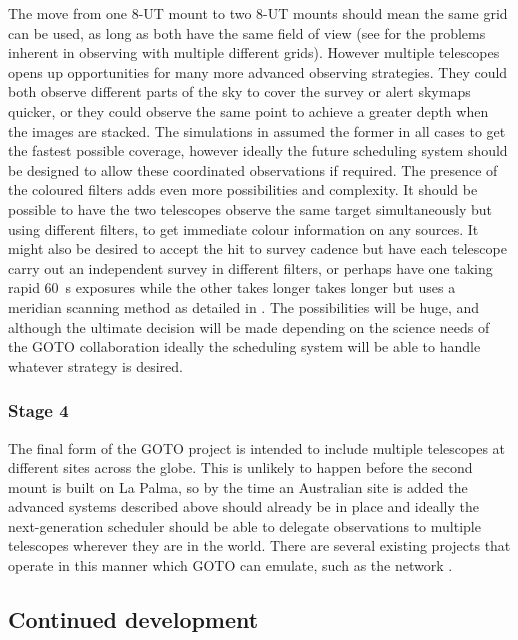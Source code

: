 \begin{colsection}
\begin{colsection}
The move from one 8-UT mount to two 8-UT mounts should mean the same grid can be used, as long as both have the same field of view (see
for the problems inherent in observing with multiple different grids). However multiple telescopes opens up opportunities for many more advanced observing strategies. They could both observe different parts of the sky to cover the survey or alert skymaps quicker, or they could observe the same point to achieve a greater depth when the images are stacked. The simulations in
assumed the former in all cases to get the fastest possible coverage, however ideally the future scheduling system should be designed to allow these coordinated observations if required. The presence of the coloured filters adds even more possibilities and complexity. It should be possible to have the two telescopes observe the same target simultaneously but using different filters, to get immediate colour information on any sources. It might also be desired to accept the hit to survey cadence but have each telescope carry out an independent survey in different filters, or perhaps have one taking rapid \SI{60}{\second} exposures while the other takes longer takes longer but uses a meridian scanning method as detailed in
.
The possibilities will be huge, and although the ultimate decision will be made depending on the science needs of the GOTO collaboration ideally the scheduling system will be able to handle whatever strategy is desired.

\subsubsection{Stage 4}

The final form of the GOTO project is intended to include multiple telescopes at different sites across the globe. This is unlikely to happen before the second mount is built on La Palma, so by the time an Australian site is added the advanced systems described above should already be in place and ideally the next-generation scheduler should be able to delegate observations to multiple telescopes wherever they are in the world. There are several existing projects that operate in this manner which GOTO can emulate, such as the  network \citep{LCO_scheduling}.

\end{colsection}

\newpage
\subsection{Continued development}
\label{sec:software_future}
\begin{colsection}


\end{colsection}
\end{colsection}
